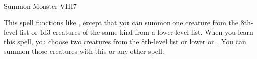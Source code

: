 \begin{spellsection}{Summon Monster VIII}{7}
\begin{spellheader}
\end{spellheader}
\begin{spellcontent}
    \spelleffect This spell functions like , except that you can summon one creature from the 8th-level list or 1d3 creatures of the same kind from a lower-level list. When you learn this spell, you choose two creatures from the 8th-level list or lower on . You can summon those creatures with this or any other  spell.
    \spelldur \durshort \dismissable
\end{spellcontent}
\begin{spellfooter}
\end{spellfooter}
\end{spellsection}

